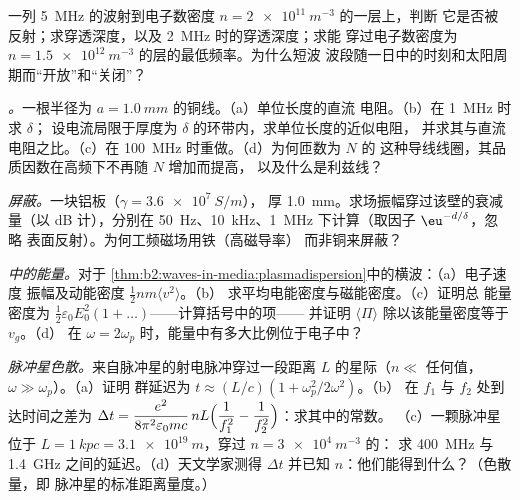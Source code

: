 \begin{exercise}[$\star$]\label{exo:b2:waves-in-media:4}
一列 \qty{5}{MHz} 的波射到电子数密度 $n = \qty{2e11}{m^{-3}}$ 的一层上，判断
它是否被反射；求穿透深度，以及 \qty{2}{MHz} 时的穿透深度；求能
穿过电子数密度为 $n = \qty{1.5e12}{m^{-3}}$ 的层的最低频率。为什么短波
波段随一日中的时刻和太阳周期而“开放”和“关闭”？
\end{exercise}

\begin{exercise}[$\star\star$]\label{exo:b2:waves-in-media:5}
\emph{。}一根半径为 $a = \qty{1.0}{mm}$ 的铜线。（a）单位长度的直流
电阻。（b）在 \qty{1}{MHz} 时求 $\delta$；
设电流局限于厚度为 $\delta$ 的环带内，求单位长度的近似电阻，
并求其与直流电阻之比。（c）在 \qty{100}{MHz} 时重做。（d）为何匝数为 $N$ 的
这种导线线圈，其品质因数在高频下不再随 $N$ 增加而提高，
以及什么是利兹线？
\end{exercise}

\begin{exercise}[$\star\star$]\label{exo:b2:waves-in-media:6}
\emph{屏蔽。}一块铝板（$\gamma = \qty{3.6e7}{S/m}$），
厚 \qty{1.0}{mm}。求场振幅穿过该壁的衰减量（以 dB 计），分别在
\qty{50}{Hz}、\qty{10}{kHz}、\qty{1}{MHz} 下计算（取因子 $\eu^{-d/\delta}$，忽略
表面反射）。为何工频磁场用铁（高磁导率）
而非铜来屏蔽？
\end{exercise}

\begin{exercise}[$\star\star$]\label{exo:b2:waves-in-media:7}
\emph{中的能量。}对于
\cref{thm:b2:waves-in-media:plasmadispersion}中的横波：（a）电子速度
振幅及动能密度 $\tfrac12nm\langle v^2\rangle$。（b）
求平均电能密度与磁能密度。（c）证明总
能量密度为 $\tfrac12\varepsilon_0E_0^2(1 + \dots)$——计算括号中的项——
并证明 $\langle\Pi\rangle$ 除以该能量密度等于 $v_g$。（d）
在 $\omega = 2\omega_p$ 时，能量中有多大比例位于电子中？
\end{exercise}

\begin{exercise}[$\star\star$]\label{exo:b2:waves-in-media:8}
\emph{脉冲星色散。}来自脉冲星的射电脉冲穿过一段距离
$L$ 的星际（$n \ll$ 任何值，$\omega \gg \omega_p$）。（a）证明
群延迟为 $t \approx (L/c)(1 + \omega_p^2/2\omega^2)$。（b）
在 $f_1$ 与 $f_2$ 处到达时间之差为 $\Delta t = \dfrac{e^2}{8\pi^2
\varepsilon_0mc}\,nL\Bigl(\dfrac1{f_1^2} - \dfrac1{f_2^2}\Bigr)$：求其中的常数。
（c）一颗脉冲星位于 $L = \qty{1}{kpc} = \qty{3.1e19}{m}$，穿过 $n = \qty{3e4}{m^{-3}}$ 的：
求 \qty{400}{MHz} 与 \qty{1.4}{GHz} 之间的延迟。（d）天文学家测得
$\Delta t$ 并已知 $n$：他们能得到什么？（色散量，即
脉冲星的标准距离量度。）
\end{exercise}

